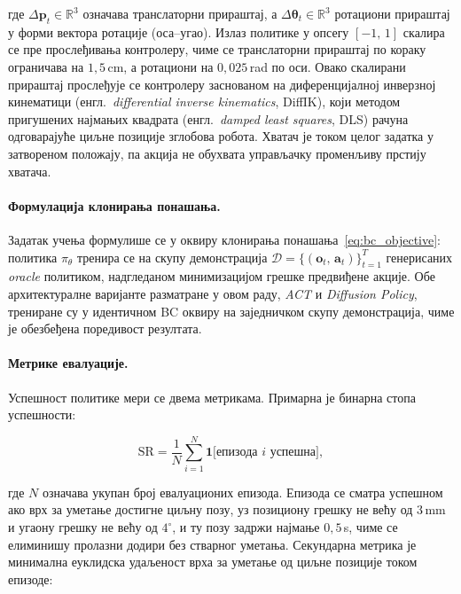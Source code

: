 \documentclass[12pt, a4paper]{article}
\begin{document}
\noindent где $\Delta\mathbf{p}_t \in \mathbb{R}^3$ означава транслаторни прираштај, а $\Delta\boldsymbol{\theta}_t \in \mathbb{R}^3$ ротациони прираштај у форми вектора ротације (оса–угао).
Излаз политике у опсегу $[-1,\,1]$ скалира се пре прослеђивања контролеру, чиме се транслаторни прираштај по кораку ограничава на $1{,}5$\,cm, а ротациони на $0{,}025$\,rad по оси.
Овако скалирани прираштај прослеђује се контролеру заснованом на диференцијалној инверзној кинематици (енгл.\ \textit{differential inverse kinematics}, DiffIK), који методом пригушених најмањих квадрата (енгл.\ \textit{damped least squares}, DLS) рачуна одговарајуће циљне позиције зглобова робота.
Хватач је током целог задатка у затвореном положају, па акција не обухвата управљачку променљиву прстију хватача.

\paragraph{Формулација клонирања понашања.}
Задатак учења формулише се у оквиру клонирања понашања~\eqref{eq:bc_objective}: политика $\pi_\theta$ тренира се на скупу демонстрација $\mathcal{D} = \{(\mathbf{o}_t,\,\mathbf{a}_t)\}_{t=1}^{T}$ генерисаних \textit{oracle} политиком, надгледаном минимизацијом грешке предвиђене акције.
Обе архитектуралне варијанте разматране у овом раду, \textit{ACT} и \textit{Diffusion Policy}, трениране су у идентичном BC оквиру на заједничком скупу демонстрација, чиме је обезбеђена поредивост резултата.

\paragraph{Метрике евалуације.}
Успешност политике мери се двема метрикама.
Примарна је бинарна стопа успешности:

\begin{equation}
    \mathrm{SR} = \frac{1}{N}\sum_{i=1}^{N}
        \mathbf{1}\bigl[\text{епизода } i \text{ успешна}\bigr],
    \label{eq:success_rate}
\end{equation}

\noindent где $N$ означава укупан број евалуационих епизода.
Епизода се сматра успешном ако врх за уметање достигне циљну позу, уз позициону грешку не већу од $3$\,mm и угаону грешку не већу од $4^\circ$, и ту позу задржи најмање $0{,}5$\,s, чиме се елиминишу пролазни додири без стварног уметања.
Секундарна метрика је минимална еуклидска удаљеност врха за уметање од циљне позиције током епизоде:
\end{document}
